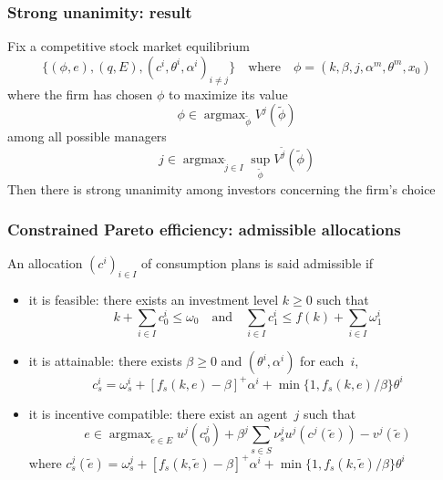 \documentclass[blue]{beamer}
\def\leq{\leqslant}
\def\geq{\geqslant}
\def\et{\quad \textrm{and} \quad}
\DeclareMathOperator\argmax{argmax}
\theoremstyle{definition}
\theoremstyle{example}
\begin{document}

\begin{frame}\frametitle{Strong unanimity: result}

\begin{theorem}
Fix a competitive stock market equilibrium
\[
\{(\phi,e),(q,E),(c^i,\theta^i,\alpha^i)_{i\neq j}\} \quad \textrm{where} \quad \phi = (k,\beta,j,\alpha^m,\theta^m,x_0)
\]
where the firm has chosen $\phi$ to maximize its value
\[
\phi \in \argmax_{\tilde{\phi}} V^j(\tilde{\phi})
\]
among all possible managers
\[
j\in \argmax_{\tilde{j} \in I} \sup_{\tilde{\phi}} V^{\tilde{j}} (\tilde{\phi})
\]
Then there is strong unanimity among investors concerning the firm's choice
\end{theorem}

\end{frame}



\begin{frame}\frametitle{Constrained Pareto efficiency: admissible allocations}

\begin{definition}
An allocation $(c^i)_{i\in I}$ of consumption plans is said \alert{admissible} if
\begin{itemize}
\item it is \alert{feasible}: there exists an investment level $k\geq 0$ such that
\[
k + \sum_{i\in I} c^i_0 \leq \omega_0 \et \sum_{i\in I} c^i_1 \leq f(k) +  \sum_{i\in I} \omega^i_1
\]
\item it is \alert{attainable}: there exists $\beta\geq 0$ and $(\theta^i,\alpha^i)$ for each~$i$,
    \[
    c^i_s = \omega^i_s + [f_s(k,e) - \beta]^+ \alpha^i + \min\{1,f_s(k,e)/\beta\} \theta^i
    \]
\item it is \alert{incentive compatible}: there exist an agent~$j$ such that
\[
e \in \argmax_{\tilde{e} \in E} u^j(c^j_0) + \beta^j \sum_{s\in S} \nu^j_s u^j(c^j(\tilde{e})) - v^j(\tilde{e})
\]
where $c^j_s(\tilde{e}) = \omega^j_s + [f_s(k,\tilde{e}) - \beta]^+ \alpha^i + \min\{1,f_s(k,\tilde{e})/\beta\} \theta^i$
\end{itemize}
\end{definition}

\end{frame}

\end{document}
